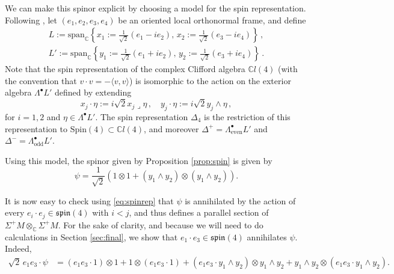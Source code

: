 \documentclass[oneside,12pt]{amsart}
\theoremstyle{definition}
\numberwithin{equation}{section}
\begin{document}
We can make this spinor explicit by choosing a model for the spin representation. Following \cite{AHL}, let $(e_1 , e_2 , e_3 , e_4)$ be an oriented local orthonormal frame, and define
\begin{align*} 
L := \mathrm{span}_{\mathbb{C}} \left\{ x_1 := \frac{1}{\sqrt{2}} \left( e_1 - i e_2 \right) , \, x_2 := \frac{1}{\sqrt{2}} \left( e_3 - i e_4 \right) \right\} \, , \\
L' := \mathrm{span}_{\mathbb{C}} \left\{ y_1 := \frac{1}{\sqrt{2}} \left( e_1 + i e_2 \right) , \, y_2 := \frac{1}{\sqrt{2}} \left( e_3 + i e_4 \right) \right\} \, . 
\end{align*} 
Note that the spin representation of the complex Clifford algebra $\mathbb{C}l(4)$ (with the convention that $v \cdot v = - \langle v , v \rangle$) is isomorphic to the action on the exterior algebra $\Lambda^{\bullet} L'$ defined by extending 
\begin{equation}\label{eq:spinrep}
x_j \cdot \eta := i \sqrt{2} x_j \lrcorner \eta \, , \quad y_j \cdot \eta := i \sqrt{2} y_j \wedge \eta \, ,  
\end{equation} 
for $i = 1,2$ and $\eta \in \Lambda^{\bullet} L'$. The spin representation $\Delta_4$ is the restriction of this representation to $\mathrm{Spin}(4) \subset \mathbb{C}l(4)$, and moreover $\Delta^+ = \Lambda^{\bullet}_{\text{even}} L'$ and $\Delta^- = \Lambda^{\bullet}_{\text{odd}} L'$. 

Using this model, the spinor given by Proposition \ref{prop:spin} is given by 
\begin{equation}\label{eq:psi}
\psi = \frac{1}{\sqrt{2}} \left( 1 \otimes 1 + (y_1 \wedge y_2) \otimes (y_1 \wedge y_2) \right) . 
\end{equation}

It is now easy to check using \eqref{eq:spinrep} that $\psi$ is annihilated by the action of every $e_i \cdot e_j \in \mathfrak{spin}(4)$ with $i < j$, and thus defines a parallel section of $\Sigma^+ M \otimes_{\mathbb{C}} \Sigma^+ M$. For the sake of clarity, and because we will need to do calculations in Section \ref{sec:final}, we show that $e_1 \cdot e_3 \in \mathfrak{spin}(4)$ annihilates $\psi$. Indeed, 
\begin{align*}
    \sqrt{2} \, e_1 e_3 \cdot \psi &= (e_1 e_3 \cdot 1) \otimes 1 + 1 \otimes (e_1 e_3 \cdot 1) + (e_1 e_3 \cdot y_1 \wedge y_2) \otimes y_1 \wedge y_2 + y_1 \wedge y_2 \otimes (e_1 e_3 \cdot y_1 \wedge y_2) . 
\end{align*}
\end{document}
